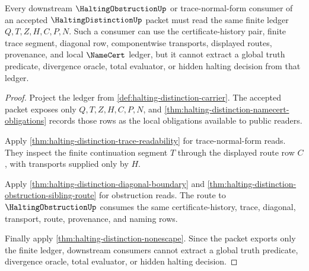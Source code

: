 \begin{theorem}
\label{thm:halting-distinction-root-ledger-nonescape}
Every downstream $\HaltingObstructionUp$ or trace-normal-form consumer of an accepted $\HaltingDistinctionUp$ packet must read the same finite ledger $Q,T,Z,H,C,P,N$. Such a consumer can use the certificate-history pair, finite trace segment, diagonal row, componentwise transports, displayed routes, provenance, and local $\NameCert$ ledger, but it cannot extract a global truth predicate, divergence oracle, total evaluator, or hidden halting decision from that ledger.
\end{theorem}
\begin{proof}
Project the ledger from \autoref{def:halting-distinction-carrier}. The accepted packet exposes only $Q,T,Z,H,C,P,N$, and \autoref{thm:halting-distinction-namecert-obligations} records those rows as the local obligations available to public readers.

Apply \autoref{thm:halting-distinction-trace-readability} for trace-normal-form reads. They inspect the finite continuation segment $T$ through the displayed route row $C$, with transports supplied only by $H$.

Apply \autoref{thm:halting-distinction-diagonal-boundary} and \autoref{thm:halting-distinction-obstruction-sibling-route} for obstruction reads. The route to $\HaltingObstructionUp$ consumes the same certificate-history, trace, diagonal, transport, route, provenance, and naming rows.

Finally apply \autoref{thm:halting-distinction-nonescape}. Since the packet exports only the finite ledger, downstream consumers cannot extract a global truth predicate, divergence oracle, total evaluator, or hidden halting decision.
\end{proof}

